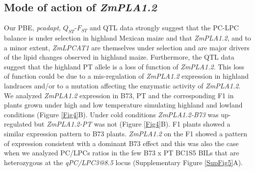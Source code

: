 \documentclass[9pt,twocolumn,twoside,lineno]{BioRxiv}
\begin{document}
\subsection{Mode of action of \textit{ZmPLA1.2}} 
Our PBE, \textit{pcadapt}, $Q_{ST}$-$F_{ST}$ and QTL data strongly suggest that the PC-LPC balance is under selection in highland Mexican maize and that \textit{ZmPLA1.2}, and to a minor extent, \textit{ZmLPCAT1} are themselves under selection and are major drivers of the lipid changes observed in highland maize. 
Furthermore, the QTL data suggest that the highland PT allele is a loss of function of \textit{ZmPLA1.2}. 
This loss of function could be due to a mis-regulation of \textit{ZmPLA1.2} expression in highland landraces and/or to a mutation affecting the enzymatic activity of \textit{ZmPLA1.2}. 
We analyzed \textit{ZmPLA1.2} expression in B73, PT and the corresponding F1 in plants grown under high and low temperature simulating highland and lowland conditions (Figure \ref{Fig4}B). 
Under cold conditions \textit{ZmPLA1.2-B73} was up-regulated but \textit{ZmPLA1.2-PT} was not (Figure \ref{Fig4}B). F1 plants showed a similar expression pattern to B73 plants.
\textit{ZmPLA1.2} on the F1 showed a pattern of expression consistent with a dominant B73 effect and this was also the case when we analyzed PC/LPCs ratios in the few B73 x PT BC1S5 BILs that are heterozygous at the \textit{qPC/LPC3@8.5} locus (Supplementary Figure \ref{SupFig5}A).
\end{document}
